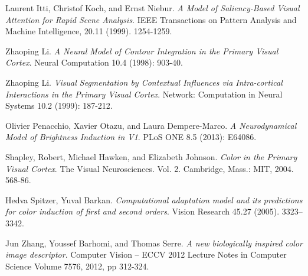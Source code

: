 \documentclass[journal,onecolumn]{IEEEtran}
\begin{document}
\ifCLASSOPTIONcaptionsoff
  \newpage
\fi





%
%
%
\begin{thebibliography}{1}

    Laurent Itti, Christof Koch, and Ernst Niebur.
    \emph{A Model of Saliency-Based Visual Attention for Rapid Scene Analysis}.
    IEEE Transactions on Pattern Analysis and Machine Intelligence, 20.11 (1999). 1254-1259.
  
  Zhaoping Li.
  \emph{A Neural Model of Contour Integration in the Primary Visual Cortex}.
  Neural Computation 10.4 (1998): 903-40.

  Zhaoping Li.
  \emph{Visual Segmentation by Contextual Influences via Intra-cortical Interactions in the Primary Visual Cortex}.
  Network: Computation in Neural Systems 10.2 (1999): 187-212.

  Olivier Penacchio, Xavier Otazu, and Laura Dempere-Marco.
  \emph{A Neurodynamical Model of Brightness Induction in V1}.
  PLoS ONE 8.5 (2013): E64086.

  Shapley, Robert, Michael Hawken, and Elizabeth Johnson.
  \emph{Color in the Primary Visual Cortex}.
  The Visual Neurosciences. Vol. 2.
  Cambridge, Mass.: MIT, 2004.
  568-86.

    Hedva Spitzer, Yuval Barkan.
    \emph{Computational adaptation model and its predictions for color induction of first and second orders}.
    Vision Research 45.27 (2005). 3323–3342.

    Jun Zhang, Youssef Barhomi, and Thomas Serre.
    \emph{A new biologically inspired color image descriptor}.
    Computer Vision – ECCV 2012
    Lecture Notes in Computer Science Volume 7576, 2012, pp 312-324.
    
\end{thebibliography}
\end{document}
